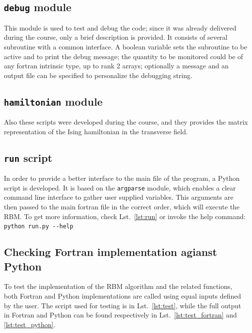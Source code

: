 \documentclass[a4paper,11pt]{article}
\begin{document}

\subsection{\texttt{debug} module}

This module is used to test and debug the code; since it was already delivered during the course, only a brief description is provided. It consists of several subroutine with a common interface. A boolean variable sets the subroutine to be active and to print the debug message; the quantity to be monitored could be of any fortran intrinsic type, up to rank 2 arrays; optionally a message and an output file can be specified to personalize the debugging string.


\subsection{\texttt{hamiltonian} module}

Also these scripts were developed during the course, and they provides the matrix representation of the Ising hamiltonian in the transverse field.


\subsection{\texttt{run} script}

In order to provide a better interface to the main file of the program, a Python script is developed. It is based on the \texttt{argparse} module, which enables a clear command line interface to gather user supplied variables. This arguments are then passed to the main fortran file in the correct order, which will execute the RBM. To get more information, check Lst.~\ref{lst:run} or invoke the help command: \verb!python run.py --help!


\subsection{Checking Fortran implementation agianst Python}
\label{sec:test}

To test the implementation of the RBM algorithm and the related functions, both Fortran and Python implementations are called using equal inputs defined by the user. The script used for testing is in Lst.~\ref{lst:test}, while the full output in Fortran and Python can be found respectively in Lst.~\ref{lst:test_fortran} and \ref{lst:test_python}.
\end{document}
